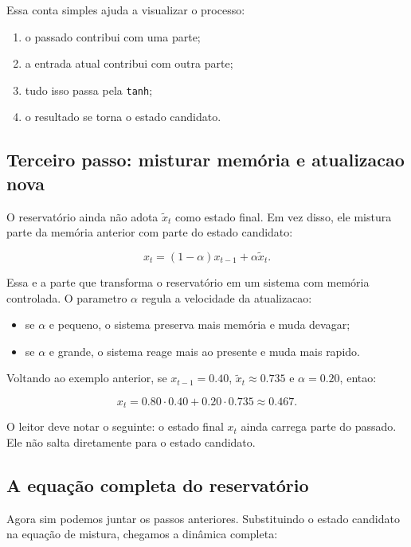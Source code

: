 \documentclass[12pt]{article}
\providecommand{\tightlist}{%
              \setlength{\itemsep}{0pt}\setlength{\parskip}{0pt}}
\begin{document}
Essa conta simples ajuda a visualizar o processo:

\begin{enumerate}
\def\labelenumi{\arabic{enumi}.}
\tightlist
\item
  o passado contribui com uma parte;
\item
  a entrada atual contribui com outra parte;
\item
  tudo isso passa pela \texttt{tanh};
\item
  o resultado se torna o estado candidato.
\end{enumerate}

\subsection{Terceiro passo: misturar memória e atualizacao nova}\label{36-terceiro-passo-misturar-memuxf3ria-e-atualizacao-nova}

O reservatório ainda não adota \(\widetilde{x}_t\) como estado final. Em vez disso, ele mistura parte da memória anterior com parte do estado candidato:

\[
x_t = (1 - \alpha) x_{t-1} + \alpha \widetilde{x}_t.
\]

Essa e a parte que transforma o reservatório em um sistema com memória controlada. O parametro \(\alpha\) regula a velocidade da atualizacao:

\begin{itemize}
\tightlist
\item
  se \(\alpha\) e pequeno, o sistema preserva mais memória e muda devagar;
\item
  se \(\alpha\) e grande, o sistema reage mais ao presente e muda mais rapido.
\end{itemize}

Voltando ao exemplo anterior, se \(x_{t-1} = 0.40\), \(\widetilde{x}_t \approx 0.735\) e \(\alpha = 0.20\), entao:

\[
x_t = 0.80 \cdot 0.40 + 0.20 \cdot 0.735 \approx 0.467.
\]

O leitor deve notar o seguinte: o estado final \(x_t\) ainda carrega parte do passado. Ele não salta diretamente para o estado candidato.

\subsection{A equação completa do reservatório}\label{37-a-equauxe7uxe3o-completa-do-reservatuxf3rio}

Agora sim podemos juntar os passos anteriores. Substituindo o estado candidato na equação de mistura, chegamos a dinâmica completa:
\end{document}
